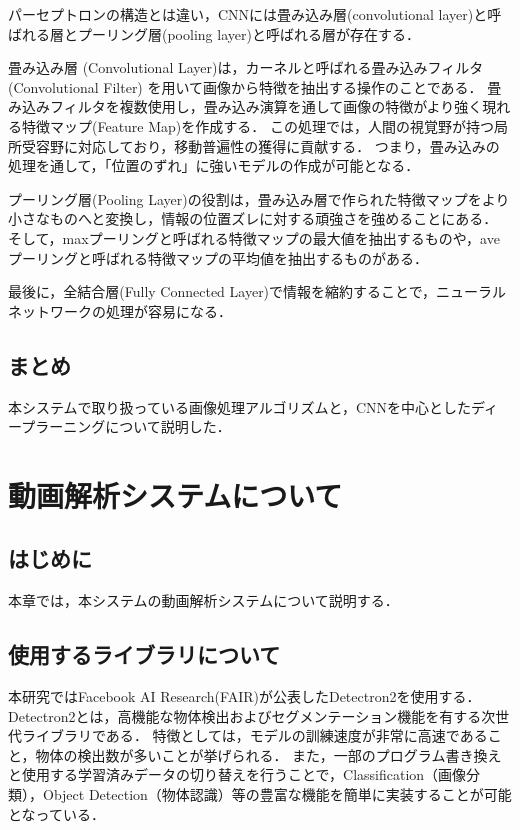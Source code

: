 \documentclass[a4j,12pt,dvipdfmx]{jreport}
\begin{document}
パーセプトロンの構造とは違い，CNNには畳み込み層(convolutional layer)と呼ばれる層とプーリング層(pooling layer)と呼ばれる層が存在する．

畳み込み層 (Convolutional Layer)は，カーネルと呼ばれる畳み込みフィルタ (Convolutional Filter) を用いて画像から特徴を抽出する操作のことである．
畳み込みフィルタを複数使用し，畳み込み演算を通して画像の特徴がより強く現れる特徴マップ(Feature Map)を作成する．
この処理では，人間の視覚野が持つ局所受容野に対応しており，移動普遍性の獲得に貢献する．
つまり，畳み込みの処理を通して，「位置のずれ」に強いモデルの作成が可能となる．

プーリング層(Pooling Layer)の役割は，畳み込み層で作られた特徴マップをより小さなものへと変換し，情報の位置ズレに対する頑強さを強めることにある．
そして，maxプーリングと呼ばれる特徴マップの最大値を抽出するものや，aveプーリングと呼ばれる特徴マップの平均値を抽出するものがある．

最後に，全結合層(Fully Connected Layer)で情報を縮約することで，ニューラルネットワークの処理が容易になる．

\section{まとめ}
本システムで取り扱っている画像処理アルゴリズムと，CNNを中心としたディープラーニングについて説明した．
\clearpage
\chapter{動画解析システムについて}
\label{sec:system}

\section{はじめに}
\label{chap3-1}
本章では，本システムの動画解析システムについて説明する．

\section{使用するライブラリについて}
\label{chap3-2}
本研究ではFacebook AI Research(FAIR)が公表したDetectron2を使用する．
Detectron2とは，高機能な物体検出およびセグメンテーション機能を有する次世代ライブラリである\cite{detectron2}．
特徴としては，モデルの訓練速度が非常に高速であること，物体の検出数が多いことが挙げられる．
また，一部のプログラム書き換えと使用する学習済みデータの切り替えを行うことで，Classification（画像分類），Object Detection（物体認識）等の豊富な機能を簡単に実装することが可能となっている．
\end{document}
